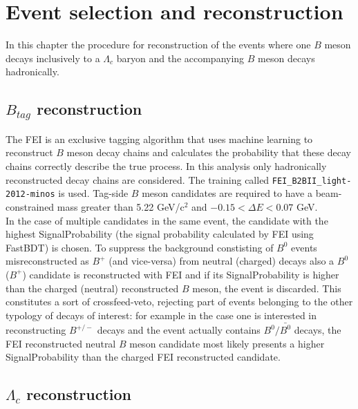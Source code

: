 \section{Event selection and reconstruction}

In this chapter the procedure for reconstruction of the events where one $B$ meson decays inclusively
to a $\Lambda_c$ baryon and the accompanying $B$ meson decays hadronically.

\subsection{$B_{tag}$ reconstruction}

The FEI is an exclusive tagging algorithm that uses machine learning to reconstruct
$B$ meson decay chains and calculates the probability that these decay chains correctly
describe the true process. In this analysis only hadronically reconstructed decay chains are
considered. The training called \texttt{FEI\_}\texttt{B2BII\_}\texttt{light-2012-minos} is used. Tag-side $B$ meson candidates are required to have a beam-constrained mass greater than 5.22 GeV/c$^2$ and $- 0.15 < \Delta E < 0.07 $   GeV. \\
In the case of multiple candidates in the same event, the candidate with the highest SignalProbability (the signal probability calculated by FEI using FastBDT) is chosen. To suppress the background constisting of $B^0$ events misreconstructed as $B^+$ (and vice-versa) from neutral (charged) decays also a $B^0$ ($B^+$) candidate is reconstructed with FEI and if its SignalProbability is higher than the charged (neutral) reconstructed $B$ meson, the event is discarded. This constitutes a sort of crossfeed-veto, rejecting part of events belonging to the other typology of decays of interest: for example in the case one is interested in reconstructing $B^{+/-}$ decays and the event actually contains $B^0/\bar{B^0}$ decays, the FEI reconstructed neutral $B$ meson candidate most likely presents a higher SignalProbability than the charged FEI reconstructed candidate.

\subsection{$\Lambda_c$ reconstruction}

